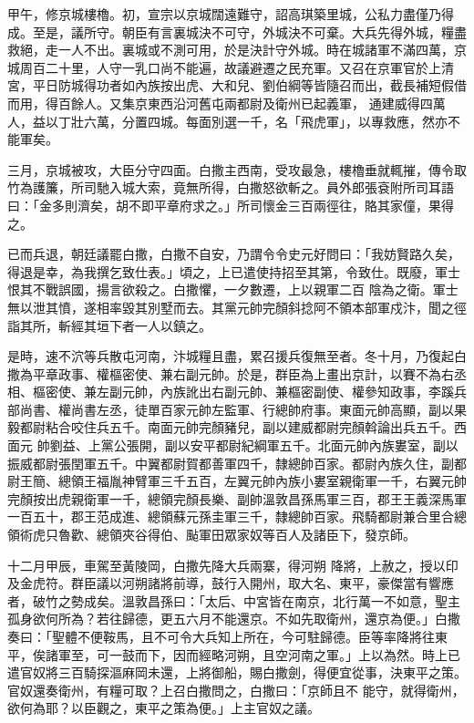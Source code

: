 \begin{pinyinscope}
 甲午，修京城樓櫓。初，宣宗以京城闊遠難守，詔高琪築里城，公私力盡僅乃得成。至是，議所守。朝臣有言裏城決不可守，外城決不可棄。大兵先得外城，糧盡救絕，走一人不出。裏城或不測可用，於是決計守外城。時在城諸軍不滿四萬，京城周百二十里，人守一乳口尚不能遍，故議避遷之民充軍。又召在京軍官於上清宮，平日防城得功者如內族按出虎、大和兒、劉伯綱等皆隨召而出，截長補短假借而用，得百餘人。又集京東西沿河舊屯兩都尉及衛州已起義軍，
 通建威得四萬人，益以丁壯六萬，分置四城。每面別選一千，名「飛虎軍」，以專救應，然亦不能軍矣。



 三月，京城被攻，大臣分守四面。白撒主西南，受攻最急，樓櫓垂就輒摧，傳令取竹為護簾，所司馳入城大索，竟無所得，白撒怒欲斬之。員外郎張袞附所司耳語曰：「金多則濟矣，胡不即平章府求之。」所司懷金三百兩徑往，賂其家僮，果得之。



 已而兵退，朝廷議罷白撒，白撒不自安，乃謂令令史元好問曰：「我妨賢路久矣，得退是幸，為我撰乞致仕表。」頃之，上已遣使持招至其第，令致仕。既廢，軍士恨其不戰誤國，揚言欲殺之。白撒懼，一夕數遷，上以親軍二百
 陰為之衛。軍士無以泄其憤，遂相率毀其別墅而去。其黨元帥完顏斜捻阿不領本部軍戍汴，聞之徑詣其所，斬經其垣下者一人以鎮之。



 是時，速不泬等兵散屯河南，汴城糧且盡，累召援兵復無至者。冬十月，乃復起白撒為平章政事、權樞密使、兼右副元帥。於是，群臣為上畫出京計，以賽不為右丞相、樞密使、兼左副元帥，內族訛出右副元帥、兼樞密副使、權參知政事，李蹊兵部尚書、權尚書左丞，徒單百家元帥左監軍、行總帥府事。東面元帥高顯，副以果毅都尉粘合咬住兵五千。南面元帥完顏豬兒，副以建威都尉完顏斡論出兵五千。西面元
 帥劉益、上黨公張開，副以安平都尉紀綱軍五千。北面元帥內族婁室，副以振威都尉張閏軍五千。中翼都尉賀都善軍四千，隸總帥百家。都尉內族久住，副都尉王簡、總領王福胤神臂軍三千五百，左翼元帥內族小婁室親衛軍一千，右翼元帥完顏按出虎親衛軍一千，總領完顏長樂、副帥溫敦昌孫馬軍三百，郡王王義深馬軍一百五十，郡王范成進、總領蘇元孫圭軍三千，隸總帥百家。飛騎都尉兼合里合總領術虎只魯歡、總領夾谷得伯、颭軍田眾家奴等百人及諸臣下，發京師。



 十二月甲辰，車駕至黃陵岡，白撒先降大兵兩寨，得河朔
 降將，上赦之，授以印及金虎符。群臣議以河朔諸將前導，鼓行入開州，取大名、東平，豪傑當有響應者，破竹之勢成矣。溫敦昌孫曰：「太后、中宮皆在南京，北行萬一不如意，聖主孤身欲何所為？若往歸德，更五六月不能還京。不如先取衛州，還京為便。」白撒奏曰：「聖體不便鞍馬，且不可令大兵知上所在，今可駐歸德。臣等率降將往東平，俟諸軍至，可一鼓而下，因而經略河朔，且空河南之軍。」上以為然。時上已遣官奴將三百騎探漚麻岡未還，上將御船，賜白撒劍，得便宜從事，決東平之策。官奴還奏衛州，有糧可取？上召白撒問之，白撒曰：「京師且不
 能守，就得衛州，欲何為耶？以臣觀之，東平之策為便。」上主官奴之議。




\end{pinyinscope}
